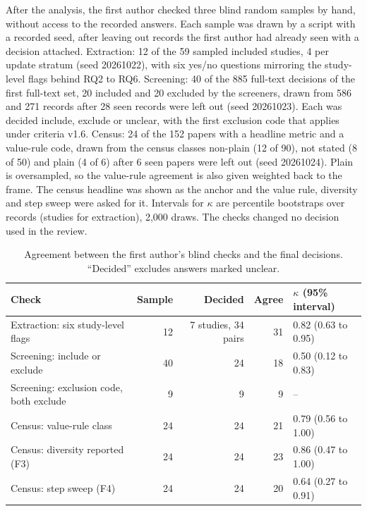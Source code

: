 \documentclass[acmsmall,screen]{acmart}
\begin{document}
After the analysis, the first author checked three blind random samples by hand, without access to the recorded answers. Each sample was drawn by a script with a recorded seed, after leaving out records the first author had already seen with a decision attached. Extraction: 12 of the 59 sampled included studies, 4 per update stratum (seed 20261022), with six yes/no questions mirroring the study-level flags behind RQ2 to RQ6. Screening: 40 of the 885 full-text decisions of the first full-text set, 20 included and 20 excluded by the screeners, drawn from 586 and 271 records after 28 seen records were left out (seed 20261023). Each was decided include, exclude or unclear, with the first exclusion code that applies under criteria v1.6. Census: 24 of the 152 papers with a headline metric and a value-rule code, drawn from the census classes non-plain (12 of 90), not stated (8 of 50) and plain (4 of 6) after 6 seen papers were left out (seed 20261024). Plain is oversampled, so the value-rule agreement is also given weighted back to the frame. The census headline was shown as the anchor and the value rule, diversity and step sweep were asked for it. Intervals for $\kappa$ are percentile bootstraps over records (studies for extraction), 2,000 draws. The checks changed no decision used in the review. %

\begin{table}[h]
\caption{Agreement between the first author's blind checks and the final decisions. ``Decided'' excludes answers marked unclear.}
\label{tab:author-checks}
\small
\begin{tabular}{@{}p{5.2cm}rrrl@{}}
\toprule
Check & Sample & Decided & Agree & $\kappa$ (95\% interval) \\
\midrule
Extraction: six study-level flags & 12 & 7 studies, 34 pairs & 31 & 0.82 (0.63 to 0.95) \\ %
Screening: include or exclude & 40 & 24 & 18 & 0.50 (0.12 to 0.83) \\ %
Screening: exclusion code, both exclude & 9 & 9 & 9 & -- \\ %
Census: value-rule class & 24 & 24 & 21 & 0.79 (0.56 to 1.00) \\ %
Census: diversity reported (F3) & 24 & 24 & 23 & 0.86 (0.47 to 1.00) \\ %
Census: step sweep (F4) & 24 & 24 & 20 & 0.64 (0.27 to 0.91) \\ %
\bottomrule
\end{tabular}
\end{table}
\end{document}
